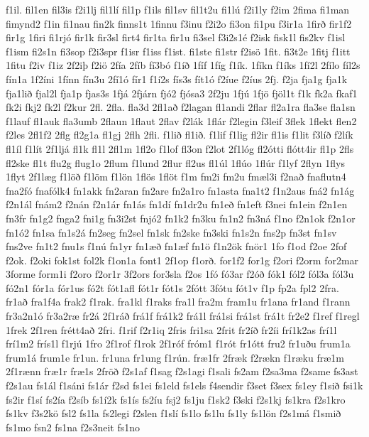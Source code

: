 {f1il.
fil1en
fil3is
f2i1lj
fil1lí
fil1p
f1ils
fil1sv
fil1t2u
fi1lú
f2i1ly
f2im
2fima
fi1man
fimynd2
f1in
fi1nau
fin2k
finns1t
1finnu
f3inu
f2i2o
fi3on
fi1pu
f3ir1a
1firð
fir1f2
fir1g
1firi
fi1rjó
fir1k
fir3sl
firt4
fir1ta
fir1u
fi3sel
f3i2s1é
f2isk
fisk1l
fis2kv
f1isl
f1ism
fi2s1n
fi3sop
f2i3spr
f1isr
f1iss
f1ist.
fi1ste
fi1str
f2isö
1fit.
fi3t2e
1fitj
f1itt
1fitu
f2iv
f1iz
2f2iþ
f2iö
2fía
2fíb
fí3bó
f1íð
1fíf
1fíg
f1ík.
1fíkn
f1íks
1fí2l
2fílo
fíl2s
fín1a
1f2íni
1fínn
fín3u
2fí1ó
fír1
f1í2s
fís3s
fít1ó
f2íue
f2íus
2fj.
f2ja
fja1g
fja1k
fja1lið
fjal2l
fja1p
fjas3s
1fjá
2fjárn
fjó2
fjósa3
2f2ju
1fjú
1fjö
fjöl1t
f1k
fk2a
fkaf1
fk2i
fkj2
fk2l
f2kur
2fl.
2fla.
fla3d
2fl1að
f2lagan
fl1andi
2flar
fl2a1ra
fla3se
fla1sn
f1lauf
fl1auk
fla3umb
2flaun
1flaut
2flav
f2lák
1flár
f2legin
f3leif
3flek
1flekt
flen2
f2les
2fl1f2
2flg
fl2g1a
fl1gj
2flh
2fli.
f1lið
fl1ið.
f1lif
f1lig
fl2ir
fl1is
f1lit
f3líð
f2lík
fl1íl
f1lít
2f1ljá
fl1k
fl1l
2fl1m
1fl2o
f1lof
fl3on
f2lot
2f1lóg
fl2ótti
flótt4ir
fl1p
2fls
fl2ske
fl1t
flu2g
flug1o
2flum
f1lund
2flur
fl2us
fl1úl
1flúo
1flúr
f1lyf
2flyn
1flys
1flyt
2f1læg
f1löð
f1löm
f1lön
1flös
1flöt
f1m
fm2i
fm2u
fmæl3i
f2nað
fnaflutn4
fna2fó
fnafólk4
fn1akk
fn2aran
fn2are
fn2a1ro
fn1asta
fna1t2
f1n2aus
fná2
fn1ág
f2n1ál
fnám2
f2nán
f2n1ár
fn1ás
fn1dí
fn1dr2u
fn1eð
fn1eft
f3nei
fn1ein
f2n1en
fn3fr
fn1g2
fnga2
fni1g
fn3i2st
fnjó2
fn1k2
fn3ku
fn1n2
fn3ná
f1no
f2n1ok
f2n1or
fn1ó2
fn1sa
fn1s2á
fn2seg
fn2sel
fn1sk
fn2ske
fn3ski
fn1s2n
fns2p
fn3st
fn1sv
fns2ve
fn1t2
fnu1s
f1nú
fn1yr
fn1æð
fn1æf
fn1ö
f1n2ök
fnör1
1fo
f1od
f2oe
2fof
f2ok.
f2oki
fok1st
fol2k
f1on1a
font1
2f1op
f1orð.
for1f2
for1g
f2ori
f2orm
for2mar
3forme
form1i
f2oro
f2or1r
3f2ors
for3sla
f2os
1fó
fó3ar
f2óð
fók1
fól2
fól3a
fól3u
fó2n1
fór1a
fór1us
fó2t
fót1afl
fót1r
fót1s
2fótt
3fótu
fót1v
f1p
fp2a
fpl2
2fra.
fr1að
fra1f4a
frak2
f1rak.
fra1kl
f1raks
fra1l
fra2m
fram1u
fr1ana
fr1and
f1rann
fr3a2n1ó
fr3a2ræ
fr2á
2f1ráð
frá1f
frá1k2
frá1l
frá1si
frá1st
frá1t
fr2e2
f1ref
f1regl
1frek
2f1ren
frétt4að
2fri.
f1rif
f2r1iq
2fris
fri1sa
2frit
fr2íð
fr2íi
frí1k2as
frí1l
frí1m2
frís1l
f1rjú
1fro
2f1rof
f1rok
2f1róf
fróm1
f1rót
fr1ótt
fru2
fr1uðu
frum1a
frum1á
frum1e
fr1un.
fr1una
fr1ung
f1rún.
fræ1fr
2fræk
f2rækn
f1ræku
fræ1m
2f1rænn
fræ1r
fræ1s
2fröð
f2s1af
f1sag
f2s1agi
f1sali
fs2am
f2sa3ma
f2same
fs3ast
f2s1au
fs1ál
f1sáni
fs1ár
f2sd
fs1ei
fs1eld
fs1els
f4sendir
f3set
f3sex
fs1ey
f1sið
fsi1k
fs2ir
f1sí
fs2ía
f2síb
fs1í2k
fs1ís
fs2íu
fsj2
fs1ju
f1sk2
f3ski
f2s1kj
fs1kra
f2s1kro
fs1kv
f3s2kö
fsl2
fs1la
fs2legi
f2slen
f1slí
fs1lo
fs1lu
fs1ly
fs1lön
f2s1má
f1smið
fs1mo
fsn2
fs1na
f2s3neit
fs1no
}
